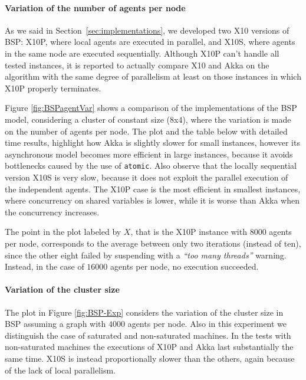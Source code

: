 \documentclass[a4paper]{article}
\numberwithin{equation}{section}
\begin{document}
\paragraph{Variation of the number of agents per node}
As we said in Section~\ref{sec:implementations}, we developed two X10
versions of BSP: X10P, where local agents are executed in parallel,
and X10S, where agents in the same node are executed sequentially. 
Although X10P can't handle all tested instances, it is reported to
actually compare X10 and Akka on the algorithm with the same degree
of parallelism at least on those instances in which X10P properly
terminates. 



Figure \ref{fig:BSPagentVar} shows a comparison of the
implementations of the BSP model, considering a cluster of constant
size ($8$x$4$), where the variation is made on the number of agents
per node. 
The plot and the table below with detailed time results, highlight how
Akka is slightly slower for small instances,
however its asynchronous model becomes more efficient in large
instances, because it avoids bottlenecks caused by the use of
\verb+atomic+. 
Also observe that the locally sequential version X10S is very slow, because
it does not exploit the parallel execution of the independent agents. 
The X10P case is the most efficient in smallest instances, where
concurrency on shared variables is lower, while it is worse than Akka
when the concurrency increases. 

The point in the plot labeled by $X$, that is the X10P instance with
$8000$ agents per node, corresponds to the average
between only two iterations (instead of ten), since the other eight
failed by suspending with a \emph{``too many threads''} warning. 
Instead, in the case of $16000$ agents per node, no execution
succeeded. 




\paragraph{Variation of the cluster size}The  plot in Figure \ref{fig:BSP-Exp} considers the variation 
of the cluster size in BSP assuming a graph with $4000$ agents 
per node. Also in this experiment we distinguish the case of 
saturated and non-saturated machines.
In the tests with non-saturated machines the
executions of X10P and Akka last substantially the same time. 
X10S is instead proportionally slower than the others, again because 
of the lack of local parallelism.
\end{document}
